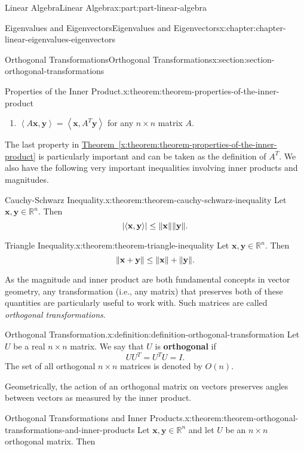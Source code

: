 \documentclass[twoside,10pt,]{book}
\newcommand{\xreffont}{\relax}
\newcommand{\terminology}[1]{\textbf{#1}}
\numberwithin{equation}{part}
\newcommand{\RR}{\mathbb{R}}
\providecommand{\vb}[1]{\mathbf{#1}}
\newcommand{\dotprod}[1]{\left\langle #1 \right\rangle}
\begin{document}
\begin{partptx}{Linear Algebra}{}{Linear Algebra}{}{}{x:part:part-linear-algebra}
\begin{chapterptx}{Eigenvalues and Eigenvectors}{}{Eigenvalues and Eigenvectors}{}{}{x:chapter:chapter-linear-eigenvalues-eigenvectors}
\begin{sectionptx}{Orthogonal Transformations}{}{Orthogonal Transformations}{}{}{x:section:section-orthogonal-transformations}
\begin{theorem}{Properties of the Inner Product.}{}{x:theorem:theorem-properties-of-the-inner-product}
\begin{enumerate}
\item{}\(\dotprod{A\vb{x},\vb{y}} = \dotprod{\vb{x},A^{T}\vb{y}}\) for any \(n\times n\) matrix \(A\).%
\end{enumerate}
%
\end{theorem}
The last property in \hyperref[x:theorem:theorem-properties-of-the-inner-product]{Theorem~{\xreffont\ref{x:theorem:theorem-properties-of-the-inner-product}}} is particularly important and can be taken as the definition of \(A^{T}\). We also have the following very important inequalities involving inner products and magnitudes.%
\begin{theorem}{Cauchy-Schwarz Inequality.}{}{x:theorem:theorem-cauchy-schwarz-inequality}%
Let \(\vb{x},\vb{y}\in\RR^n\). Then%
\begin{equation*}
\abs{\dotprod{\vb{x},\vb{y}}}\leq\norm{\vb{x}}\norm{\vb{y}}.
\end{equation*}
%
\end{theorem}
\begin{theorem}{Triangle Inequality.}{}{x:theorem:theorem-triangle-inequality}%
%
Let \(\vb{x},\vb{y}\in\RR^n\). Then%
\begin{equation*}
\norm{\vb{x} + \vb{y}}\leq\norm{\vb{x}} + \norm{\vb{y}}.
\end{equation*}
%
\end{theorem}
As the magnitude and inner product are both fundamental concepts in vector geometry, any transformation (i.e., any matrix) that preserves both of these quantities are particularly useful to work with. Such matrices are called \emph{orthogonal transformations}.%
\begin{definition}{Orthogonal Transformation.}{x:definition:definition-orthogonal-transformation}%
%
Let \(U\) be a real \(n\times n\) matrix. We say that \(U\) is \terminology{orthogonal} if%
\begin{equation*}
UU^{T} = U^{T}U = I.
\end{equation*}
The set of all orthogonal \(n\times n\) matrices is denoted by \(O(n)\).%
\end{definition}
Geometrically, the action of an orthogonal matrix on vectors preserves angles between vectors as measured by the inner product.%
\begin{theorem}{Orthogonal Transformations and Inner Products.}{}{x:theorem:theorem-orthogonal-transformations-and-inner-products}%
Let \(\vb{x},\vb{y}\in\RR^n\) and let \(U\) be an \(n\times n\) orthogonal matrix. Then%
\begin{equation*}

\end{equation*}
\end{theorem}
\end{sectionptx}
\end{chapterptx}
\end{partptx}
\end{document}
